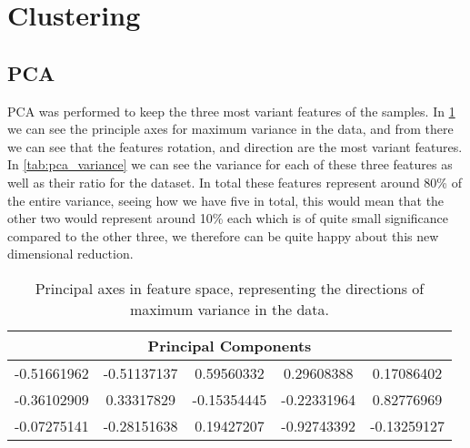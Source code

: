 %


\section{Clustering}

\subsection{PCA}

PCA was performed to keep the three most variant features of the samples. In \ref{tab:pca_components} we can see the principle axes for maximum variance in the data, and from there we can see that the features rotation, and direction are the most variant features. In \ref{tab:pca_variance} we can see the variance for each of these three features as well as their ratio for the dataset. In total these features represent around 80\% of the entire variance, seeing how we have five in total, this would mean that the other two would represent around 10\% each which is of quite small significance compared to the other three, we therefore can be quite happy about this new dimensional reduction.

\begin{table}
	\begin{tabular}{ c c c c c }
		\hline
		\multicolumn{5}{c}{Principal Components} \\ \hline
		-0.51661962 & -0.51137137 &  0.59560332 &  0.29608388 &  0.17086402 \\ \hline
		-0.36102909 &  0.33317829 & -0.15354445 & -0.22331964 &  0.82776969 \\ \hline
		-0.07275141 & -0.28151638 &  0.19427207 & -0.92743392 & -0.13259127 \\ \hline
	\end{tabular}
	\caption{Principal axes in feature space, representing the directions of maximum variance in the data.}
	\label{tab:pca_components}
\end{table}

